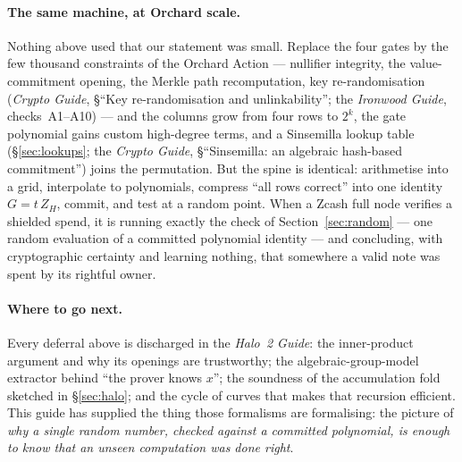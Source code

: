 \documentclass[11pt,a4paper]{article}
\theoremstyle{definition}
\newcommand{\ZH}{Z_H}
\begin{document}
\paragraph{The same machine, at Orchard scale.} Nothing above used that our
statement was small. Replace the four gates by the few thousand constraints of
the Orchard Action --- nullifier integrity, the value-commitment opening, the
Merkle path recomputation, key re-randomisation (\emph{Crypto Guide}, \S``Key
re-randomisation and unlinkability''; the \emph{Ironwood Guide},
checks~A1--A10) --- and the columns grow from four rows to $2^{k}$, the gate
polynomial gains custom high-degree terms, and a Sinsemilla lookup table
(\S\ref{sec:lookups}; the \emph{Crypto Guide},
\S``Sinsemilla: an algebraic hash-based commitment'') joins
the permutation. But the spine is identical: arithmetise into a grid, interpolate
to polynomials, compress ``all rows correct'' into one identity $G = t\,\ZH$,
commit, and test at a random point. When a Zcash full node verifies a shielded
spend, it is running exactly the check of Section~\ref{sec:random} --- one
random evaluation of a committed polynomial identity --- and concluding,
with cryptographic certainty and learning nothing, that somewhere a valid note
was spent by its rightful owner.

\paragraph{Where to go next.} Every deferral above is discharged in the
\emph{Halo~2 Guide}: the inner-product argument and why its openings are
trustworthy; the algebraic-group-model extractor behind ``the prover knows
$x$''; the soundness of the accumulation fold sketched in \S\ref{sec:halo};
and the cycle of curves that makes that recursion efficient. This guide has supplied the thing those formalisms are
formalising: the picture of \emph{why a single random number, checked against a
committed polynomial, is enough to know that an unseen computation was done
right}.
\end{document}
